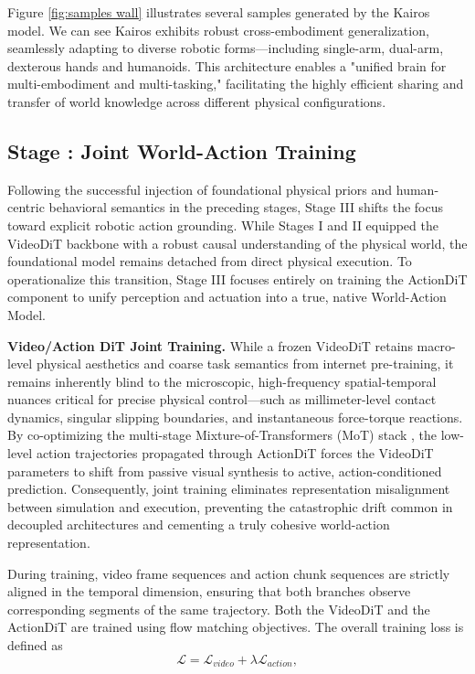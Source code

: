 \documentclass{llmxive}
\begin{document}
Figure \ref{fig:samples wall} illustrates several samples generated by the Kairos model. We can see Kairos exhibits robust cross-embodiment generalization, seamlessly adapting to diverse robotic forms—including single-arm, dual-arm, dexterous hands and humanoids. This architecture enables a "unified brain for multi-embodiment and multi-tasking," facilitating the highly efficient sharing and transfer of world knowledge across different physical configurations. 



\subsection{Stage \uppercase\expandafter{}: Joint World-Action Training}

Following the successful injection of foundational physical priors and human-centric behavioral semantics in the preceding stages, Stage III shifts the focus toward explicit robotic action grounding. While Stages I and II equipped the VideoDiT backbone with a robust causal understanding of the physical world, the foundational model remains detached from direct physical execution. To operationalize this transition, Stage III focuses entirely on training the ActionDiT component to unify perception and actuation into a true, native World-Action Model.



 



\textbf {Video/Action DiT Joint Training.} While a frozen VideoDiT retains macro-level physical aesthetics and coarse task semantics from internet pre-training, it remains inherently blind to the microscopic, high-frequency spatial-temporal nuances critical for precise physical control—such as millimeter-level contact dynamics, singular slipping boundaries, and instantaneous force-torque reactions. By co-optimizing the multi-stage Mixture-of-Transformers (MoT) stack \citep{yuan2026fastwam}, the low-level action trajectories propagated through ActionDiT forces the VideoDiT parameters to shift from passive visual synthesis to active, action-conditioned prediction. Consequently, joint training eliminates representation misalignment between simulation and execution, preventing the catastrophic drift common in decoupled architectures and cementing a truly cohesive world-action representation.



During training, video frame sequences and action chunk sequences are strictly aligned in the temporal dimension, ensuring that both branches observe corresponding segments of the same trajectory. Both the VideoDiT and the ActionDiT are trained using flow matching objectives. The overall training loss is defined as
\begin{equation}
    \mathcal{L} = \mathcal{L}_{video} + \lambda\mathcal{L}_{action},
\end{equation}
\end{document}
